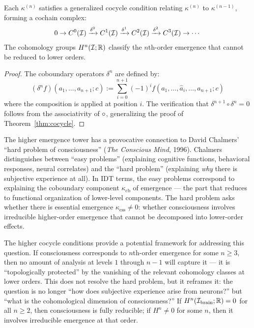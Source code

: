 \begin{theorem}
\label{thm:higher-cocycle}
Each $\kappa^{(n)}$ satisfies a generalized cocycle condition relating
$\kappa^{(n)}$ to $\kappa^{(n-1)}$, forming a cochain complex:
\[
  0 \to C^0(\mathcal{I}) \xrightarrow{\delta^0} C^1(\mathcal{I}) \xrightarrow{\delta^1}
  C^2(\mathcal{I}) \xrightarrow{\delta^2} C^3(\mathcal{I}) \to \cdots
\]
The cohomology groups $H^n(\mathcal{I}; \mathbb{R})$ classify the $n$th-order
emergence that cannot be reduced to lower orders.
\end{theorem}

\begin{proof}
The coboundary operators $\delta^n$ are defined by:
\[
  (\delta^n f)(a_1, \ldots, a_{n+1}; c) := \sum_{i=0}^{n+1} (-1)^i
  f(a_1, \ldots, \hat{a}_i, \ldots, a_{n+1}; c)
\]
where the composition is applied at position $i$.  The verification that
$\delta^{n+1} \circ \delta^n = 0$ follows from the associativity of
$\circ$, generalizing the proof of Theorem~\ref{thm:cocycle}.
\end{proof}

\begin{interpretation}
\label{interp:ch19:chalmers_hard_problem}
The higher emergence tower has a provocative connection to David Chalmers'
``hard problem of consciousness'' (\textit{The Conscious Mind}, 1996).
Chalmers distinguishes between ``easy problems'' (explaining cognitive
functions, behavioral responses, neural correlates) and the ``hard problem''
(explaining \emph{why} there is subjective experience at all).  In IDT
terms, the easy problems correspond to explaining the coboundary component
$\kappa_{\text{cb}}$ of emergence --- the part that reduces to functional
organization of lower-level components.  The hard problem asks whether
there is essential emergence $\kappa_{\text{ess}} \neq 0$: whether
consciousness involves irreducible higher-order emergence that cannot be
decomposed into lower-order effects.

The higher cocycle conditions provide a potential framework for addressing
this question.  If consciousness corresponds to $n$th-order emergence for
some $n \geq 3$, then no amount of analysis at levels $1$ through $n-1$
will capture it --- it is ``topologically protected'' by the vanishing
of the relevant cohomology classes at lower orders.  This does not resolve
the hard problem, but it reframes it: the question is no longer ``how
does subjective experience arise from neurons?'' but ``what is the
cohomological dimension of consciousness?''  If $H^n(\mathcal{I}_{\text{brain}};
\mathbb{R}) = 0$ for all $n \geq 2$, then consciousness is fully reducible;
if $H^n \neq 0$ for some $n$, then it involves irreducible emergence
at that order.
\end{interpretation}

